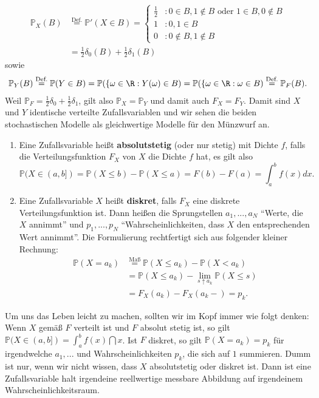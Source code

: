 \begin{beispiel1}
	\begin{align*}
		\mathbb P_X(B)&\overset{\text{Def.}}{=}\mathbb P'(X\in B)=\begin{cases}
			\frac 1 2 &: 0\in B, 1\notin B\text{ oder } 1 \in B, 0\notin B\\
			1&: 0,1\in B\\
			0&: 0\notin B, 1\notin B
		\end{cases}\\
		&=\frac{1}{2} \delta_0(B)+\frac{1}{2}\delta_1(B)
	\end{align*}
	sowie
	\begin{align*}
		\mathbb P_Y(B)\overset{\text{Def.}}{=}\mathbb P(Y\in B)=\mathbb P(\{\omega \in \R: Y(\omega)\in B)=\mathbb P(\{\omega \in \R: \omega \in B)\overset{\text{Def.}}{=} \mathbb P_F(B).
	\end{align*}
	Weil $\mathbb P_F=\frac 1 2 \delta_0+\frac 1 2 \delta_1$, gilt also $\mathbb P_X=\mathbb P_Y$ und damit auch $F_X=F_Y$. Damit sind $X$ und $Y$ identische verteilte Zufallsvariablen und wir sehen die beiden stochastischen Modelle als gleichwertige Modelle f\"ur den M\"unzwurf an.	
\end{beispiel1}

\begin{deff}
	\begin{enumerate}[label=(\roman*)]
		\item Eine Zufallsvariable heißt \textbf{absolutstetig} (oder nur stetig) mit Dichte $f$, falls die Verteilungsfunktion $F_X$ von $X$ die Dichte $f$ hat, es gilt also
		\[ \mathbb{P}(X \in (a,b] ) = \mathbb{P}( X \leq b ) - \mathbb{P}( X \leq a ) = F(b) - F(a) = \int_{a}^{b} f(x) dx.  \]
		\item Eine Zufallsvariable $X$ heißt \textbf{diskret}, falls $F_X$ eine diskrete Verteilungsfunktion ist. Dann heißen die Sprungstellen $a_1,...,a_N$ \enquote{Werte, die $X$ annimmt} und $p_1,...,p_N$ \enquote{Wahrscheinlichkeiten, dass $X$ den entsprechenden Wert annimmt}. Die Formulierung rechtfertigt sich aus folgender kleiner Rechnung:
		\begin{align*}
		 \mathbb{P}( X = a_k )& \overset{\text{Ma\ss}}{=}\mathbb{P}(X \leq a_k ) -  \mathbb{P}(X <a_k) \\
		 &= \mathbb{P}(X \leq a_k) - \lim_{s\uparrow a_k} \mathbb{P}( X \leq s ) \\
		&= F_X(a_k) - F_X(a_k-) = p_k.
		\end{align*}
	\end{enumerate}
\end{deff}
Um uns das Leben leicht zu machen, sollten wir im Kopf immer wie folgt denken: Wenn $X$ gem\"a\ss{} $F$ verteilt ist und $F$ absolut stetig ist, so gilt $\mathbb P(X\in (a,b])=\int_a^b f(x)\dint x$. Ist $F$ diskret, so gilt $\mathbb P(X=a_k)=p_k$ f\"ur irgendwelche $a_1,...$ und Wahrscheinlichkeiten $p_k$, die sich auf $1$ summieren. Dumm ist nur, wenn wir nicht wissen, dass $X$ absolutstetig oder diskret ist. Dann ist eine Zufallsvariable halt irgendeine reellwertige messbare Abbildung auf irgendeinem Wahrscheinlichkeitsraum.

